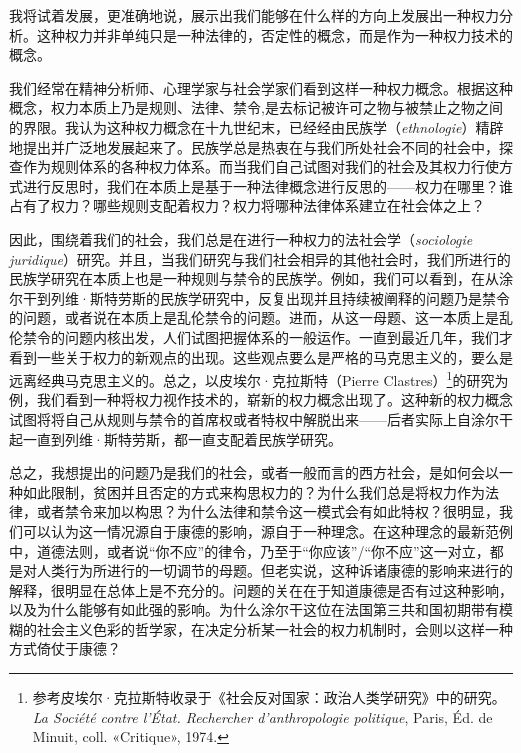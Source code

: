 \documentclass[fontset=fandol, a4paper, 12pt, twoside]{ctexart}
\newcommand{\fr}[1]{\textit{#1}}
\begin{document}
我将试着发展，更准确地说，展示出我们能够在什么样的方向上发展出一种权力分析。这种权力并非单纯只是一种法律的，否定性的概念，而是作为一种权力技术的概念。

我们经常在精神分析师、心理学家与社会学家们看到这样一种权力概念。根据这种概念，权力本质上乃是规则、法律、禁令,是去标记被许可之物与被禁止之物之间的界限。我认为这种权力概念在十九世纪末，已经经由民族学（\fr{ethnologie}）精辟地提出并广泛地发展起来了。民族学总是热衷在与我们所处社会不同的社会中，探查作为规则体系的各种权力体系。而当我们自己试图对我们的社会及其权力行使方式进行反思时，我们在本质上是基于一种法律概念进行反思的——权力在哪里？谁占有了权力？哪些规则支配着权力？权力将哪种法律体系建立在社会体之上？

因此，围绕着我们的社会，我们总是在进行一种权力的法社会学（\fr{sociologie juridique}）研究。并且，当我们研究与我们社会相异的其他社会时，我们所进行的民族学研究在本质上也是一种规则与禁令的民族学。例如，我们可以看到，在从涂尔干到列维·斯特劳斯的民族学研究中，反复出现并且持续被阐释的问题乃是禁令的问题，或者说在本质上是乱伦禁令的问题。进而，从这一母题、这一本质上是乱伦禁令的问题内核出发，人们试图把握体系的一般运作。一直到最近几年，我们才看到一些关于权力的新观点的出现。这些观点要么是严格的马克思主义的，要么是远离经典马克思主义的。总之，以皮埃尔·克拉斯特（Pierre Clastres）\footnote{参考皮埃尔·克拉斯特收录于《社会反对国家：政治人类学研究》中的研究。\fr{La Société contre l'État. Rechercher d'anthropologie politique}, Paris, Éd. de Minuit, coll. «Critique», 1974.}的研究为例，我们看到一种将权力视作技术的，崭新的权力概念出现了。这种新的权力概念试图将将自己从规则与禁令的首席权或者特权中解脱出来——后者实际上自涂尔干起一直到列维·斯特劳斯，都一直支配着民族学研究。

总之，我想提出的问题乃是我们的社会，或者一般而言的西方社会，是如何会以一种如此限制，贫困并且否定的方式来构思权力的？为什么我们总是将权力作为法律，或者禁令来加以构思？为什么法律和禁令这一模式会有如此特权？很明显，我们可以认为这一情况源自于康德的影响，源自于一种理念。在这种理念的最新范例中，道德法则，或者说“你不应”的律令，乃至于“你应该”/“你不应”这一对立，都是对人类行为所进行的一切调节的母题。但老实说，这种诉诸康德的影响来进行的解释，很明显在总体上是不充分的。问题的关在在于知道康德是否有过这种影响，以及为什么能够有如此强的影响。为什么涂尔干这位在法国第三共和国初期带有模糊的社会主义色彩的哲学家，在决定分析某一社会的权力机制时，会则以这样一种方式倚仗于康德？
\end{document}
